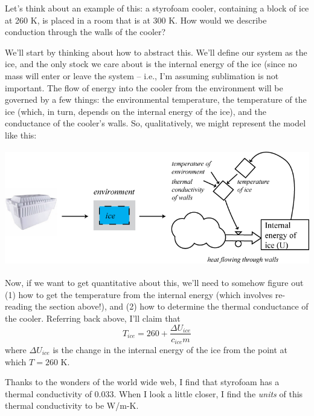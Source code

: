 \documentclass[10pt]{book}
\newcommand{\beforefig}{\vspace{0.2in}}
\newcommand{\afterfig}{\vspace{0.2in}}
\begin{document}
Let's think about an example of this:  a styrofoam cooler, containing a block of ice at 260 K, is placed in a room that is at 300 K.  How would we describe conduction through the walls of the cooler?

We'll start by thinking about how to abstract this.  We'll define our system as the ice, and the only stock we care about is the internal energy of the ice (since no mass will enter or leave the system -- i.e., I'm assuming sublimation is not important.  The flow of energy into the cooler from the environment will be governed by a few things:  the environmental temperature, the temperature of the ice (which, in turn, depends on the internal energy of the ice), and the conductance of the cooler's walls.  So, qualitatively, we might represent the model like this:


\beforefig
 \centerline{\includegraphics[height=2in]{figs/IceInACoolerAbstraction}}
\afterfig

Now, if we want to get quantitative about this, we'll need to somehow figure out (1) how to get the temperature from the internal energy (which involves re-reading the section above!), and (2) how to determine the thermal conductance of the cooler.  Referring back above, I'll claim that
$$T_{ice}=260 + \frac{\Delta U_{ice}}{c_{ice}m}$$
where $\Delta U_{ice}$ is the change in the internal energy of the ice from the point at which $T=260$ K.

Thanks to the wonders of the world wide web, I find that styrofoam has a thermal conductivity of 0.033.  When I look a little closer, I find the {\it units} of this thermal conductivity to be W/m-K.  
\end{document}
